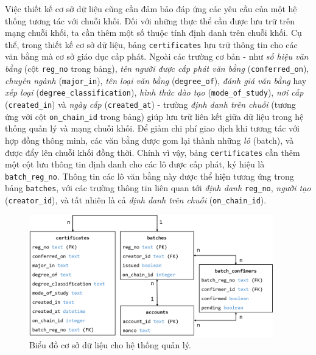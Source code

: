 Việc thiết kế cơ sở dữ liệu cũng cần đảm bảo đáp ứng các yêu cầu của một hệ thống tương tác với chuỗi khối. Đối với những thực thể cần được lưu trữ trên mạng chuỗi khối, ta cần thêm một số thuộc tính định danh trên chuỗi khối. Cụ thể, trong thiết kế cơ sở dữ liệu, bảng \texttt{certificates} lưu trữ thông tin cho các văn bằng mà cơ sở giáo dục cấp phát. Ngoài các trường cơ bản - như \textit{số hiệu văn bằng} (cột \texttt{reg\_no} trong bảng), \textit{tên người được cấp phát văn bằng} (\texttt{conferred\_on}), \textit{chuyên ngành} (\texttt{major\_in}), \textit{tên loại văn bằng} (\texttt{degree\_of}), \textit{đánh giá văn bằng} hay \textit{xếp loại} (\texttt{degree\_classification}), \textit{hình thức đào tạo} (\texttt{mode\_of\_study}), \textit{nơi cấp} (\texttt{created\_in}) và \textit{ngày cấp} (\texttt{created\_at}) - trường \textit{định danh trên chuỗi} (tương ứng với cột \texttt{on\_chain\_id} trong bảng) giúp lưu trữ liên kết giữa dữ liệu trong hệ thống quản lý và mạng chuỗi khối. Để giảm chi phí giao dịch khi tương tác với hợp đồng thông minh, các văn bằng được gom lại thành những \textit{lô} (batch), và được đẩy lên chuỗi khối đồng thời. Chính vì vậy, bảng \texttt{certificates} cần thêm một cột lưu thông tin định danh cho các lô được cấp phát, ký hiệu là \texttt{batch\_reg\_no}. Thông tin các lô văn bằng này được thể hiện tương ứng trong bảng \texttt{batches}, với các trường thông tin liên quan tới \textit{định danh} \texttt{reg\_no}, \textit{người tạo} (\texttt{creator\_id}), và tất nhiên là cả \textit{định danh trên chuỗi} (\texttt{on\_chain\_id}).\\

\begin{figure}[!ht]
    \centering
    \includegraphics[width=400px]{images/database.png}
    \caption{Biểu đồ cơ sở dữ liệu cho hệ thống quản lý.}
\end{figure}

